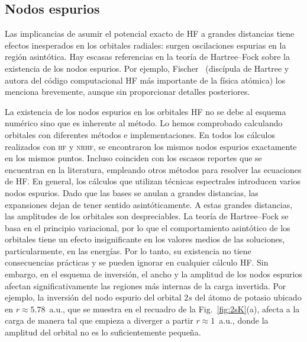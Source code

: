 \subsection{Nodos espurios}
\label{subsec:espuriosHF}

Las implicancias de asumir el potencial exacto de HF a grandes 
distancias tiene efectos inesperados en los orbitales radiales: surgen
oscilaciones espurias en la región asintótica. Hay escasas referencias 
en la teoría de Hartree--Fock sobre la existencia de los nodos espurios. 
Por ejemplo, Fischer~\cite{FroeseFischer:97} (discípula de Hartree y 
autora del código computacional HF más importante de la física atómica) 
los menciona brevemente, aunque sin proporcionar detalles posteriores. 

La existencia de los nodos espurios en los orbitales HF no se debe al 
esquema numérico sino que es inherente al método. 
Lo hemos comprobado calculando orbitales con diferentes métodos e 
implementaciones. En todos los cálculos realizados con \textsc{hf} y 
\textsc{nrhf}, se encontraron los mismos nodos espurios exactamente en 
los mismos puntos. Incluso coinciden con los escasos reportes que se 
encuentran en la literatura, empleando otros métodos para resolver las 
ecuaciones de HF. En general, los cálculos que utilizan técnicas 
espectrales introducen varios nodos espurios. Dado que las bases se 
anulan a grandes distancias, las expansiones dejan de tener sentido 
asintóticamente. A estas grandes distancias, las amplitudes de los 
orbitales son despreciables.
La teoría de Hartree--Fock se basa en el principio variacional, por lo 
que el comportamiento asintótico de los orbitales tiene un efecto 
insignificante en los valores medios de las soluciones, particularmente, 
en las energías. Por lo tanto, su existencia no tiene consecuencias 
prácticas y se pueden ignorar en cualquier cálculo HF. 
Sin embargo, en el esquema de inversión, el ancho y la amplitud de los 
nodos espurios afectan significativamente las regiones más internas de 
la carga invertida. Por ejemplo, la inversión del nodo espurio del 
orbital $2s$ del átomo de potasio ubicado en $r\approx 5.78$~a.u., que 
se muestra en el recuadro de la Fig.~\ref{fig:2sK}(a), afecta a la carga 
de manera tal que empieza a diverger a partir $r\approx 1$~a.u., donde 
la amplitud del orbital no es lo suficientemente pequeña. 

